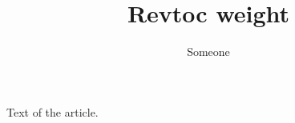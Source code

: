 \documentclass{revtex4-2}
\begin{document}
\title{Revtoc weight}
\author{Someone}
\maketitle
Text of the article.
\end{document}

